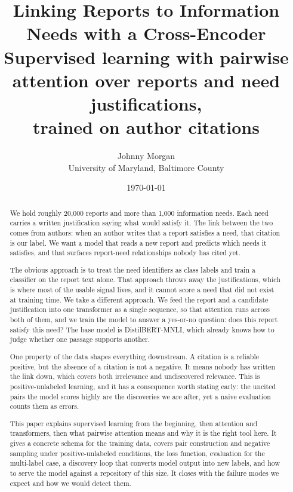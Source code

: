 \documentclass[11pt]{article}
\title{\textbf{Linking Reports to Information Needs with a Cross-Encoder}\\[4pt]
\large Supervised learning with pairwise attention over reports and need
justifications,\\ trained on author citations}
\author{Johnny Morgan\\ \small University of Maryland, Baltimore County}
\date{\today}
\begin{document}
\maketitle

\begin{abstract}
\noindent
We hold roughly 20,000 reports and more than 1,000 information needs. Each need
carries a written justification saying what would satisfy it. The link between
the two comes from authors: when an author writes that a report satisfies a
need, that citation is our label. We want a model that reads a new report and
predicts which needs it satisfies, and that surfaces report-need relationships
nobody has cited yet.

The obvious approach is to treat the need identifiers as class labels and train
a classifier on the report text alone. That approach throws away the
justifications, which is where most of the usable signal lives, and it cannot
score a need that did not exist at training time. We take a different approach.
We feed the report and a candidate justification into one transformer as a
single sequence, so that attention runs across both of them, and we train the
model to answer a yes-or-no question: does this report satisfy this need? The
base model is DistilBERT-MNLI, which already knows how to judge whether one
passage supports another.

One property of the data shapes everything downstream. A citation is a reliable
positive, but the absence of a citation is not a negative. It means nobody has
written the link down, which covers both irrelevance and undiscovered relevance.
This is positive-unlabeled learning, and it has a consequence worth stating
early: the uncited pairs the model scores highly are the discoveries we are
after, yet a naive evaluation counts them as errors.

This paper explains supervised learning from the beginning, then attention and
transformers, then what pairwise attention means and why it is the right tool
here. It gives a concrete schema for the training data, covers pair construction
and negative sampling under positive-unlabeled conditions, the loss function,
evaluation for the multi-label case, a discovery loop that converts model output
into new labels, and how to serve the model against a repository of this size.
It closes with the failure modes we expect and how we would detect them.
\end{abstract}

\tableofcontents
\newpage
\end{document}
